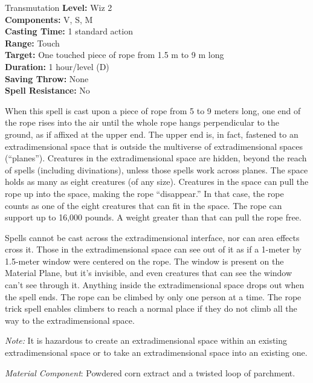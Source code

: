 {Transmutation}
{
	\textbf{Level:}
	Wiz 2\\
	\textbf{Components:}
	V, S, M\\
	\textbf{Casting Time:}
	1 standard action\\
	\textbf{Range:}
	Touch\\
	\textbf{Target:}
	One touched piece of rope from 1.5 m to 9 m long\\
	\textbf{Duration:}
	1 hour/level (D)\\
	\textbf{Saving Throw:}
	None\\
	\textbf{Spell Resistance:}
	No\\
}
{
	When this spell is cast upon a piece of rope from 5 to 9 meters long, one end of the rope rises into the air until the whole rope hangs perpendicular to the ground, as if affixed at the upper end. The upper end is, in fact, fastened to an extradimensional space that is outside the multiverse of extradimensional spaces (``planes''). Creatures in the extradimensional space are hidden, beyond the reach of spells (including divinations), unless those spells work across planes. The space holds as many as eight creatures (of any size). Creatures in the space can pull the rope up into the space, making the rope ``disappear.'' In that case, the rope counts as one of the eight creatures that can fit in the space. The rope can support up to 16,000 pounds. A weight greater than that can pull the rope free.

	Spells cannot be cast across the extradimensional interface, nor can area effects cross it. Those in the extradimensional space can see out of it as if a 1-meter by 1.5-meter window were centered on the rope. The window is present on the Material Plane, but it's invisible, and even creatures that can see the window can't see through it. Anything inside the extradimensional space drops out when the spell ends. The rope can be climbed by only one person at a time. The rope trick spell enables climbers to reach a normal place if they do not climb all the way to the extradimensional space.

	\textit{Note:} It is hazardous to create an extradimensional space within an existing extradimensional space or to take an extradimensional space into an existing one.

	\textit{Material Component}:
	Powdered corn extract and a twisted loop of parchment.

}
